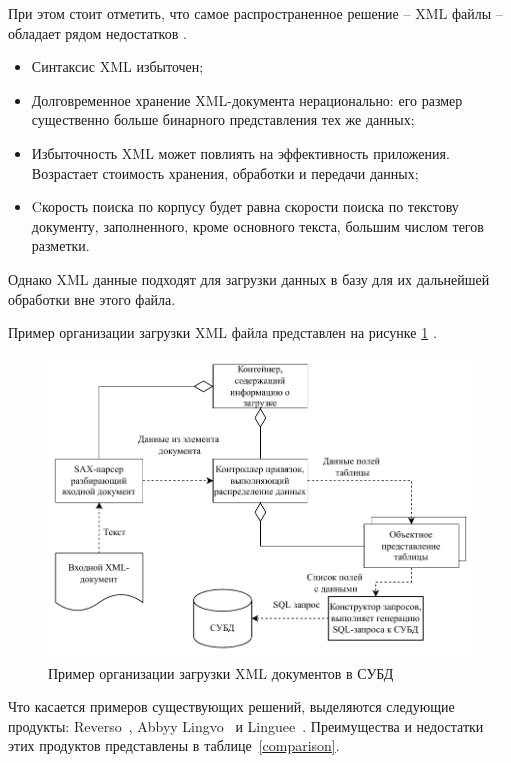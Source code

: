При этом стоит отметить, что самое распространенное решение -- XML файлы -- обладает рядом недостатков \cite{pavlov-xml-to-sql-2004}.

\begin{itemize}[label=---]
	\item Синтаксис XML избыточен;
	
	\item Долговременное хранение XML-документа нерационально: его размер существенно больше бинарного представления тех же данных;
	
	\item Избыточность XML может повлиять на эффективность приложения.
	Возрастает стоимость хранения, обработки и передачи данных;
	
	\item Cкорость поиска по корпусу будет равна скорости поиска по текстову документу, заполненного, кроме основного текста, большим числом тегов разметки.
\end{itemize}

Однако XML данные подходят для загрузки данных в базу для их дальнейшей обработки вне этого файла. \pagebreak

Пример организации загрузки XML файла представлен на рисунке \ref{xml-to-sql} \cite{pavlov-xml-to-sql-2004}.

\begin{figure}[ht]
	\centering
	\includegraphics[width=\textwidth]{img/XmlToSql.pdf}
	\caption{Пример организации загрузки XML документов в СУБД}
	\label{xml-to-sql}
\end{figure}

Что касается примеров существующих решений, выделяются следующие продукты: Reverso~\cite{reverso}, Abbyy Lingvo~\cite{abbyy-lingvo} и Linguee~\cite{linguee}. 
Преимущества и недостатки этих продуктов представлены в таблице~\ref{comparison}.

